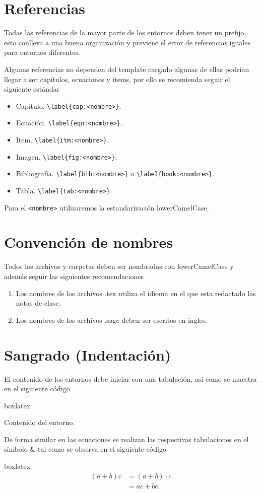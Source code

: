 {			\section{Referencias}
			Todas las referencias de la mayor parte de los entornos deben tener un prefijo, esto conlleva a una buena organización y previene el error de referencias iguales para entornos diferentes.
			\begin{boxbasic}[Estándar]
				Algunas referencias no dependen del template cargado algunas de ellas podrían llegar a ser capítulos, ecuaciones y items, por ello se recomienda seguir el siguiente estándar
				\begin{itemize}
					\item Capítulo. \verb|\label{cap:<nombre>}|.
					\item Ecuación. \verb|\label{eqn:<nombre>}|.
					\item Item. \verb|\label{itm:<nombre>}|.
					\item Imagen. \verb|\label{fig:<nombre>}|.
					\item Bibliografía. \verb|\label{bib:<nombre>}| o \verb|\label{book:<nombre>}|.
					\item Tabla. \verb|\label{tab:<nombre>}|.
				\end{itemize}
				\begin{boxbasic}[Nota]
					Para el \verb|<nombre>| utilizaremos la estandarización lowerCamelCase. 
				\end{boxbasic}
			\end{boxbasic}
		\section{Convención de nombres}
		Todos los archivos y carpetas deben ser nombradas con  lowerCamelCase y además seguir las siguientes recomendaciones
		\begin{enumerate}
			\item Los nombres de los archivos .tex utiliza el idioma en el que esta redactado las notas de clase.
			\item Los nombres de los archivos .sage deben ser escritos en ingles.
		\end{enumerate}
	    \section{Sangrado (Indentación)}
	    El contenido de los entornos debe iniciar con una tabulación, así como se muestra en el siguiente código
	    \begin{tcblisting}{boxlatex}
	    	\begin{<entorno>}
	    		Contenido del entorno.
	    	\end{<entorno>}
	    \end{tcblisting}
	    De forma similar en las ecuaciones se realizan las respectivas tabulaciones en el símbolo \& tal como se observa en el siguiente código
	    \begin{tcblisting}{boxlatex}	
	    	\begin{align*}
	    		(a+b)c&=(a+b)\cdot c\\
	    	        &=ac+bc.
	    	\end{align*}
	    \end{tcblisting}
}
